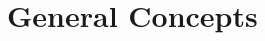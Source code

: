 \section{General Concepts}



\begin{comment}

-multivariate functions
-partial derivatives
-gradient, Jacobian, Hessian
-line integrals (of scalar function), double integrals, triple integrals
-coordinate transformations (polar, spherical, etc. -> jacobian determinant)

\end{comment} 
